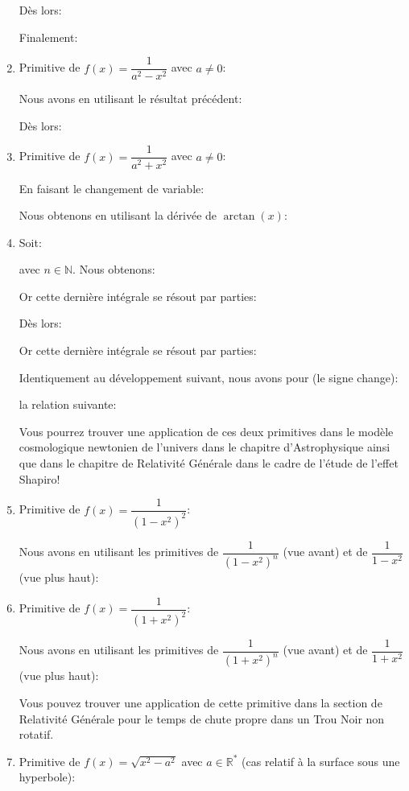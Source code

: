 \begin{enumerate}
		Dès lors:
		
		
		Finalement:
		
		
		\item Primitive de $f(x)=\dfrac{1}{a^2-x^2}$ avec $a \neq 0$:
		
		Nous avons en utilisant le résultat précédent:	
		
		Dès lors:
		

		\item Primitive de $f(x)=\dfrac{1}{a^2+x^2}$ avec $a \neq 0$:
		
		En faisant le changement de variable:
		
		Nous obtenons en utilisant la dérivée de $\arctan (x)$:
		
		
		\item Soit:
		
		avec $n \in \mathbb{N}$. Nous obtenons:
		
		Or cette dernière intégrale se résout par parties:
		
		Dès lors:
		
		Or cette dernière intégrale se résout par parties:
		
		Identiquement au développement suivant, nous avons pour (le signe change):
		
		la relation suivante:
		
		Vous pourrez trouver une application de ces deux primitives dans le modèle cosmologique newtonien de l'univers dans le chapitre d'Astrophysique ainsi que dans le chapitre de Relativité Générale dans le cadre de l'étude de l'effet Shapiro!
		
		\item Primitive de $f(x)=\dfrac{1}{(1-x^2)^2}$:
		
		Nous avons en utilisant les primitives de $\dfrac{1}{(1-x^2)^n}$ (vue avant) et de  $\dfrac{1}{1-x^2}$ (vue plus haut):
		
		
		\item Primitive de $f(x)=\dfrac{1}{(1+x^2)^2}$\label{black hole primitive}:
		
		Nous avons en utilisant les primitives de $\dfrac{1}{(1+x^2)^n}$ (vue avant) et de $\dfrac{1}{1+x^2}$ (vue plus haut):
		
		Vous pouvez trouver une application de cette primitive dans la section de  Relativité Générale pour le temps de chute propre dans un Trou Noir non rotatif.
		
		\item Primitive de $f(x)=\sqrt{x^2-a^2}$ avec $a\in \mathbb{R}^*$ (cas relatif à la surface sous une hyperbole):
		

\end{enumerate}
